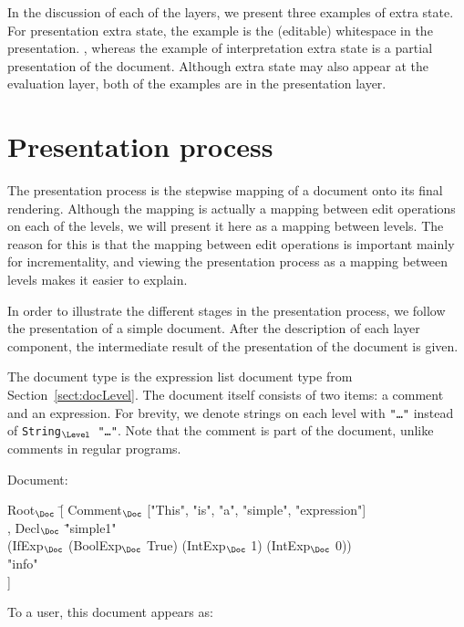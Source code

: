 \bc
In the discussion of each of the layers, we present three examples of extra state. For presentation extra state, the example is the (editable) whitespace in the presentation. , whereas the example of interpretation extra state is a partial presentation of the document. Although extra state may also appear at the evaluation layer, both of the examples are in the presentation layer. 
\ec


%																
%																
%																
\section{Presentation process} \label{sect:presprocess}

The presentation process is the stepwise mapping of a document onto its final rendering. Although the mapping is actually a mapping between edit operations on each of the levels, we will present it here as a mapping between levels. The reason for this is that the mapping between edit operations is important mainly for incrementality, and viewing the presentation process as a mapping between levels makes it easier to explain.

In order to illustrate the different stages in the presentation process, we follow the presentation of a simple document. After the description of each layer component, the intermediate result of the presentation of the document is given. 

The document type is the expression list document type from Section~\ref{sect:docLevel}. The document itself consists of two items: a comment and an expression. For brevity, we denote strings on each level with {\tt "\dots"} instead of {\tt String$_{\Level}$ "\dots"}. Note that the comment is part of the document, unlike comments in regular programs.

Document:
\small \ttfamily
\begin{tabbing}
Root$_{\Doc}$ \= [ Comment$_{\Doc}$ ["This", "is", "a", "simple", "expression"] \\
       \> , Decl$_{\Doc}$ \= "simple1" \\
       \>                        \>(IfExp$_{\Doc}$ (BoolExp$_{\Doc}$ True) (IntExp$_{\Doc}$ 1) (IntExp$_{\Doc}$ 0))\\
       \>                        \> "info"\\
       \> ] 
\end{tabbing}
\rmfamily \normalsize

To a user, this document appears as:\\

